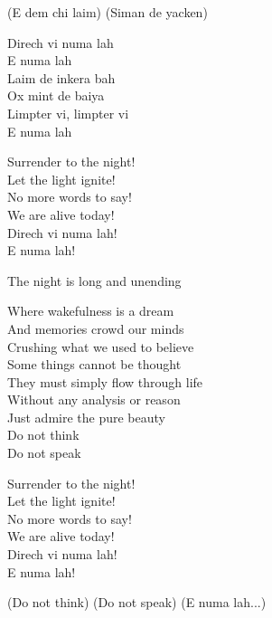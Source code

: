 \begin{lyrics}

(E dem chi laim)
(Siman de yacken)


Direch vi numa lah\\
E numa lah\\
Laim de inkera bah\\
Ox mint de baiya\\
Limpter vi, limpter vi\\
E numa lah


Surrender to the night!\\
Let the light ignite!\\
No more words to say!\\
We are alive today!\\
Direch vi numa lah!\\
E numa lah!


The night is long and unending

Where wakefulness is a dream\\
And memories crowd our minds\\
Crushing what we used to believe\\
Some things cannot be thought\\
They must simply flow through life\\
Without any analysis or reason\\
Just admire the pure beauty\\
Do not think\\
Do not speak


Surrender to the night!\\
Let the light ignite!\\
No more words to say!\\
We are alive today!\\
Direch vi numa lah!\\
E numa lah!


(Do not think)
(Do not speak)
(E numa lah...)
\end{lyrics}

